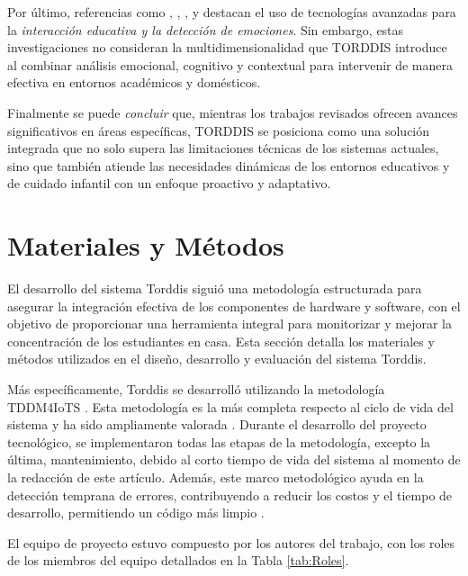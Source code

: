 \documentclass[a4paper,fleqn]{cas-sc}
\begin{document}
			Por último, referencias como \cite{Kulkarni2023 }, \cite{Enadula2021}, \cite{Ozdamli2022}, y \cite{Warren2015Brief} destacan el uso de tecnologías avanzadas para la \textit{interacción educativa y la detección de emociones}. Sin embargo, estas investigaciones no consideran la multidimensionalidad que TORDDIS introduce al combinar análisis emocional, cognitivo y contextual para intervenir de manera efectiva en entornos académicos y domésticos.
			
			Finalmente se puede \textit{concluir} que, mientras los trabajos revisados ofrecen avances significativos en áreas específicas, TORDDIS se posiciona como una solución integrada que no solo supera las limitaciones técnicas de los sistemas actuales, sino que también atiende las necesidades dinámicas de los entornos educativos y de cuidado infantil con un enfoque proactivo y adaptativo.
		
	\section{Materiales y Métodos}
	\label{seccion:Cuatro}
		El desarrollo del sistema Torddis siguió una metodología estructurada para asegurar la integración efectiva de los componentes de hardware y software, con el objetivo de proporcionar una herramienta integral para monitorizar y mejorar la concentración de los estudiantes en casa. Esta sección detalla los materiales y métodos utilizados en el diseño, desarrollo y evaluación del sistema Torddis.
		
		Más específicamente, Torddis se desarrolló utilizando la metodología TDDM4IoTS \citep{Guerrero-Ulloa2020TDDM4IoTS}. Esta metodología es la más completa respecto al ciclo de vida del sistema \citep{Guerrero-Ulloa2023Review} y ha sido ampliamente valorada \citep{Guerrero-Ulloa2023DevIdeAir,Guerrero-Ulloa2023IdeAir,Guerrero-Ulloa2023SP4,Guerrero-Ulloa2023Nawi}. Durante el desarrollo del proyecto tecnológico, se implementaron todas las etapas de la metodología, excepto la última, mantenimiento, debido al corto tiempo de vida del sistema al momento de la redacción de este artículo. Además, este marco metodológico ayuda en la detección temprana de errores, contribuyendo a reducir los costos y el tiempo de desarrollo, permitiendo un código más limpio \citep{Beck2002TDD}.
		
		El equipo de proyecto estuvo compuesto por los autores del trabajo, con los roles de los miembros del equipo detallados en la Tabla \ref{tab:Roles}.
		
\end{document}
